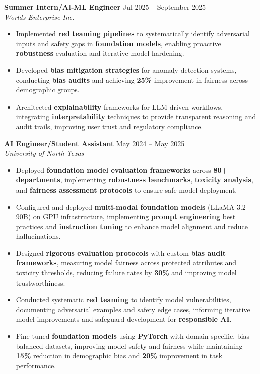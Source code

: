 \documentclass[11pt,a4paper]{article}
\newcommand{\jobentry}[3]{%
  \vspace{5pt}%
  \noindent\textbf{#1} \hfill #3\\%
  \textit{#2}%
}
\begin{document}
\jobentry{Summer Intern/AI-ML Engineer}{Worlds Enterprise Inc.}{Jul 2025 -- September 2025}
\begin{itemize}
\item Implemented \textbf{red teaming pipelines} to systematically identify adversarial inputs and safety gaps in \textbf{foundation models}, enabling proactive \textbf{robustness} evaluation and iterative model hardening.
\item Developed \textbf{bias mitigation strategies} for anomaly detection systems, conducting \textbf{bias audits} and achieving \textbf{25\%} improvement in fairness across demographic groups.
\item Architected \textbf{explainability} frameworks for LLM-driven workflows, integrating \textbf{interpretability} techniques to provide transparent reasoning and audit trails, improving user trust and regulatory compliance.
\end{itemize}

\jobentry{AI Engineer/Student Assistant}{University of North Texas}{May 2024 -- May 2025}
\begin{itemize}
\item Deployed \textbf{foundation model evaluation frameworks} across \textbf{80+ departments}, implementing \textbf{robustness benchmarks}, \textbf{toxicity analysis}, and \textbf{fairness assessment protocols} to ensure safe model deployment.
\item Configured and deployed \textbf{multi-modal foundation models} (LLaMA 3.2 90B) on GPU infrastructure, implementing \textbf{prompt engineering} best practices and \textbf{instruction tuning} to enhance model alignment and reduce hallucinations.
\item Designed \textbf{rigorous evaluation protocols} with custom \textbf{bias audit frameworks}, measuring model fairness across protected attributes and toxicity thresholds, reducing failure rates by \textbf{30\%} and improving model trustworthiness.
\item Conducted systematic \textbf{red teaming} to identify model vulnerabilities, documenting adversarial examples and safety edge cases, informing iterative model improvements and safeguard development for \textbf{responsible AI}.
\item Fine-tuned \textbf{foundation models} using \textbf{PyTorch} with domain-specific, bias-balanced datasets, improving model safety and fairness while maintaining \textbf{15\%} reduction in demographic bias and \textbf{20\%} improvement in task performance.
\end{itemize}
\end{document}
